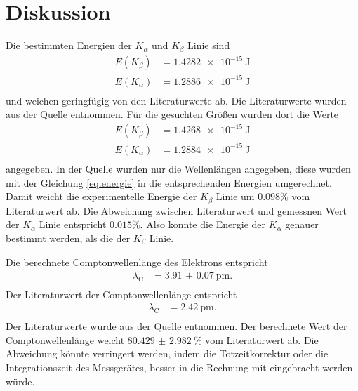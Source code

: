 \section{Diskussion}
\label{sec:Diskussion}

Die bestimmten Energien der $K_\alpha$ und $K_\beta$ Linie sind
\begin{align*}
  E(K_\beta) & = \SI{1.4282e-15}{\joule}\\
  E(K_\alpha) &= \SI{1.2886e-15}{\joule}\\
\end{align*}
und weichen geringfügig von den Literaturwerte ab.
Die Literaturwerte wurden aus der Quelle \cite[6]{roentgen} entnommen.
Für die gesuchten Größen wurden dort die Werte
\begin{align*}
    E(K_\beta) &= \SI{1.4268e-15}{\joule}\\
    E(K_\alpha) &= \SI{ 1.2884e-15}{\joule}\\
\end{align*}
angegeben.
In der Quelle wurden nur die Wellenlängen angegeben, diese wurden mit der Gleichung \eqref{eq:energie} in die entsprechenden Energien umgerechnet.
Damit weicht die experimentelle Energie der $K_\beta$ Linie um $0.098\%$ vom Literaturwert ab.
Die Abweichung zwischen Literaturwert und gemessnen Wert der $K_\alpha$ Linie entspricht $0.015\%$.
Also konnte die Energie der $K_\alpha$ genauer bestimmt werden, als die der $K_\beta$ Linie.

Die berechnete Comptonwellenlänge des Elektrons entspricht
\begin{align*}
    \lambda_\text{C} &= \SI{3.91(7)}{\pico\meter}.\\
\end{align*}
Der Literaturwert der Comptonwellenlänge entspricht
\begin{align*}
    \lambda_\text{C} &= \SI{2.42}{\pico\meter}.\\
\end{align*}
Der Literaturwerte wurde aus der Quelle \cite{compton} entnommen.
Der berechnete Wert der Comptonwellenlänge weicht $\SI{80.429(2982)}{\percent}$ vom Literaturwert ab.
Die Abweichung könnte verringert werden, indem die Totzeitkorrektur oder die Integrationszeit des Messgerätes, besser in die Rechnung mit eingebracht werden würde. 